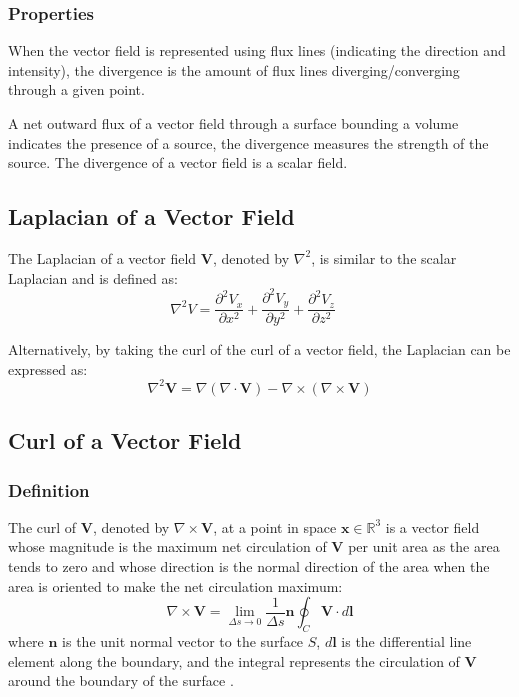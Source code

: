 \subsubsection{Properties}
When the vector field is represented using flux lines (indicating the direction and intensity), the divergence is the amount of flux lines diverging/converging through a given point.

A net outward flux of a vector field through a surface bounding a volume indicates the presence of a source, the divergence measures the strength of the source. The divergence of a vector field is a scalar field. 

\subsection{Laplacian of a Vector Field}
The Laplacian of a vector field $\mathbf{V}$, denoted by $\nabla^2$, is similar to the scalar Laplacian and is defined as:
\begin{equation}
\nabla^2 V = \frac{\partial^2 V_x}{\partial x^2} + \frac{\partial^2 V_y}{\partial y^2} + \frac{\partial^2 V_z}{\partial z^2} \quad
\end{equation}

Alternatively, by taking the curl of the curl of a vector field, the Laplacian can be expressed as:
\begin{equation}
   \nabla^2 \mathbf{V} = \nabla (\nabla \cdot \mathbf{V}) - \nabla \times (\nabla \times \mathbf{V})
   \label{eq:laplacian}
\end{equation}


\subsection{Curl of a Vector Field}

\subsubsection{Definition}
The curl of \(\mathbf{V}\), denoted by \(\nabla \times \mathbf{V}\), at a point in space \(\mathbf{x} \in \mathbb{R}^3\) is a vector field  whose magnitude is the maximum net circulation of \(\mathbf{V}\) per unit area as the area tends to zero and whose direction is the normal direction of the
area when the area is oriented to make the net circulation maximum:
\begin{equation}
\nabla \times \mathbf{V} = \lim_{\Delta s \to 0} \frac{1}{\Delta s} \mathbf{n} \oint_{C} \mathbf{V} \cdot d\mathbf{l}
\label{eq:curl}
\end{equation}
where \(\mathbf{n}\) is the unit normal vector to the surface \(S\), \(d\mathbf{l}\) is the differential line element along the boundary, and the integral represents the circulation of \(\mathbf{V}\) around the boundary of the surface \cite{book-magnetism}.

